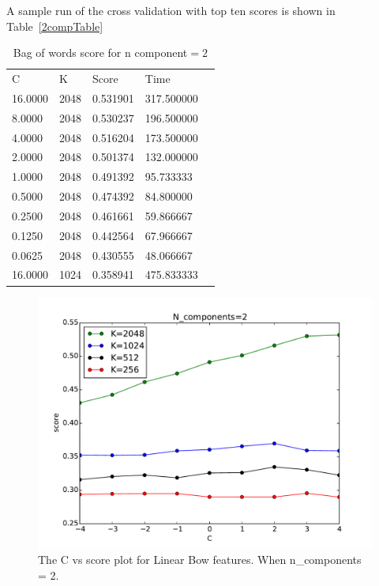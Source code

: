 \documentclass[final,leqno,onefignum,onetabnum]{siamltexmm}
\begin{document}
A sample run of the cross validation with top ten scores is shown in Table~\ref{2compTable}
\begin{table}[]\label{2compTable}
\centering
\caption{Bag of words score for n component$=2$}
\label{2comp}
\begin{tabular}{lllll}
  C      &    K &    Score &       Time \\  
16.0000 & 2048 & 0.531901 & 317.500000  \\
8.0000  & 2048 & 0.530237 & 196.500000  \\                                                                            
4.0000  & 2048 & 0.516204 & 173.500000  \\                                                                            
2.0000  & 2048 & 0.501374 & 132.000000  \\  
1.0000  & 2048 & 0.491392 &  95.733333  \\                                                                            
0.5000  & 2048 & 0.474392 &  84.800000  \\                                                                            
0.2500  & 2048 & 0.461661 &  59.866667  \\                                                                            
0.1250  & 2048 & 0.442564 &  67.966667  \\                                                                            
0.0625  & 2048 & 0.430555 &  48.066667  \\                                                                            
16.0000 & 1024 & 0.358941 & 475.833333  \\                                                                            
\end{tabular}
\end{table}

\begin{figure}
  \centering
  \includegraphics[width=0.60\linewidth]{images/score2Components}
  \caption{The C vs score plot for Linear Bow features. When n\_components = 2.\label{fig:bowf_score2}}
\end{figure}
\end{document}

